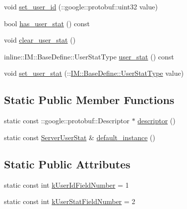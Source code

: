 \begin{DoxyCompactItemize}
\item 
void \hyperlink{class_i_m_1_1_base_define_1_1_server_user_stat_a2213c683de2d0ebac42a37cec3d0a46f}{set\+\_\+user\+\_\+id} (\+::google\+::protobuf\+::uint32 value)
\item 
bool \hyperlink{class_i_m_1_1_base_define_1_1_server_user_stat_ab76cefd3875a2bc21d79751b16971269}{has\+\_\+user\+\_\+stat} () const 
\item 
void \hyperlink{class_i_m_1_1_base_define_1_1_server_user_stat_ac971d4cf863a3871aa566a8795e7f308}{clear\+\_\+user\+\_\+stat} ()
\item 
inline\+::\+I\+M\+::\+Base\+Define\+::\+User\+Stat\+Type \hyperlink{class_i_m_1_1_base_define_1_1_server_user_stat_ae67cfe1e402524d098048a17ed5f9bbf}{user\+\_\+stat} () const 
\item 
void \hyperlink{class_i_m_1_1_base_define_1_1_server_user_stat_ab2e656873b266589af501a5375d0dcbe}{set\+\_\+user\+\_\+stat} (\+::\hyperlink{namespace_i_m_1_1_base_define_adaf1a78b7a7db0195b92cc1786d93c01}{I\+M\+::\+Base\+Define\+::\+User\+Stat\+Type} value)
\end{DoxyCompactItemize}
\subsection*{Static Public Member Functions}
\begin{DoxyCompactItemize}
\item 
static const \+::google\+::protobuf\+::\+Descriptor $\ast$ \hyperlink{class_i_m_1_1_base_define_1_1_server_user_stat_a668ccf990a435056583037c772b98427}{descriptor} ()
\item 
static const \hyperlink{class_i_m_1_1_base_define_1_1_server_user_stat}{Server\+User\+Stat} \& \hyperlink{class_i_m_1_1_base_define_1_1_server_user_stat_abd626ae1a7f21995c3a1fcdd6545d70f}{default\+\_\+instance} ()
\end{DoxyCompactItemize}
\subsection*{Static Public Attributes}
\begin{DoxyCompactItemize}
\item 
static const int \hyperlink{class_i_m_1_1_base_define_1_1_server_user_stat_a64d56239d2fcafe185b7d0c589e86a29}{k\+User\+Id\+Field\+Number} = 1
\item 
static const int \hyperlink{class_i_m_1_1_base_define_1_1_server_user_stat_ab5e97ff3b5601f9d53b7b6c401dddb71}{k\+User\+Stat\+Field\+Number} = 2
\end{DoxyCompactItemize}
